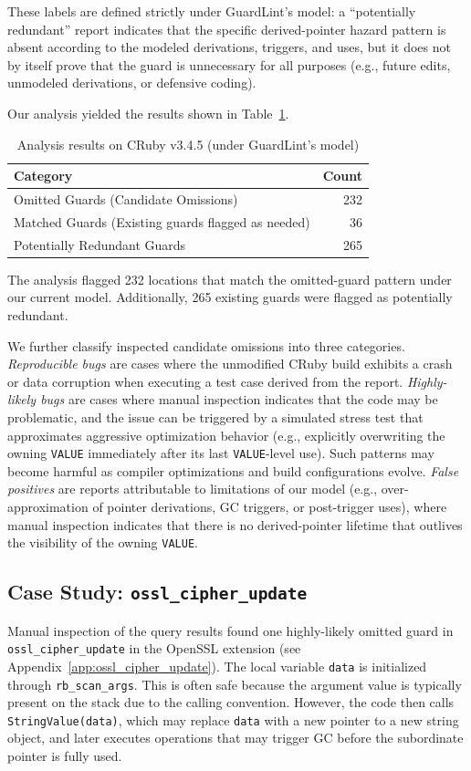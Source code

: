These labels are defined strictly under GuardLint's model: a ``potentially redundant'' report indicates that the specific derived-pointer hazard pattern is absent according to the modeled derivations, triggers, and uses, but it does not by itself prove that the guard is unnecessary for all purposes (e.g., future edits, unmodeled derivations, or defensive coding).

Our analysis yielded the results shown in Table~\ref{tab:results}.

\begin{table}[ht]
\centering
\caption{Analysis results on CRuby v3.4.5 (under GuardLint's model)}
\label{tab:results}
\begin{tabular}{lr}
\toprule
\textbf{Category} & \textbf{Count} \\
\midrule
Omitted Guards (Candidate Omissions) & 232 \\
Matched Guards (Existing guards flagged as needed) & 36 \\
Potentially Redundant Guards & 265 \\
\bottomrule
\end{tabular}
\end{table}

The analysis flagged 232 locations that match the omitted-guard pattern under our current model. Additionally, 265 existing guards were flagged as potentially redundant.

We further classify inspected candidate omissions into three categories. \emph{Reproducible bugs} are cases where the unmodified CRuby build exhibits a crash or data corruption when executing a test case derived from the report. \emph{Highly-likely bugs} are cases where manual inspection indicates that the code may be problematic, and the issue can be triggered by a simulated stress test that approximates aggressive optimization behavior (e.g., explicitly overwriting the owning \texttt{VALUE} immediately after its last \texttt{VALUE}-level use). Such patterns may become harmful as compiler optimizations and build configurations evolve. \emph{False positives} are reports attributable to limitations of our model (e.g., over-approximation of pointer derivations, GC triggers, or post-trigger uses), where manual inspection indicates that there is no derived-pointer lifetime that outlives the visibility of the owning \texttt{VALUE}.

\subsection{Case Study: \texttt{ossl\_cipher\_update}}
Manual inspection of the query results found one highly-likely omitted guard in \texttt{ossl\_cipher\_update} in the OpenSSL extension (see Appendix~\ref{app:ossl_cipher_update}). The local variable \texttt{data} is initialized through \texttt{rb\_scan\_args}. This is often safe because the argument value is typically present on the stack due to the calling convention. However, the code then calls \texttt{StringValue(data)}, which may replace \texttt{data} with a new pointer to a new string object, and later executes operations that may trigger GC before the subordinate pointer is fully used.

